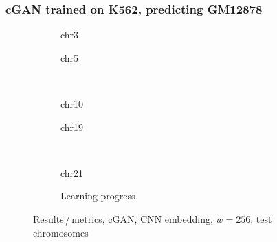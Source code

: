 \subsubsection{cGAN trained on K562, predicting GM12878}\label{sec:appendix:reverseTrainTest}
\begin{figure}[h!] %
    \begin{subfigure}{0.45\textwidth}
        \scriptsize
        \caption{chr3}
    \end{subfigure} \hfill
    \begin{subfigure}{0.45\textwidth}
        \scriptsize
        \caption{chr5}
    \end{subfigure}\\[5mm]
    \begin{subfigure}{0.45\textwidth}
        \scriptsize
        \caption{chr10}
    \end{subfigure}\hfill
    \begin{subfigure}{0.45\textwidth}
        \scriptsize
        \caption{chr19}
    \end{subfigure}\\[3mm]
    \centering
    \begin{subfigure}{0.45\textwidth}
        \scriptsize
        \caption{chr21}
    \end{subfigure} \hfill
    \begin{subfigure}{0.45\textwidth}
        \scriptsize
        \caption{Learning progress} \label{fig:appendix:GAN256_K-on-G_lossEpochs}
    \end{subfigure}
    \caption{Results\,/\,metrics, cGAN, CNN embedding, $w=256$, test chromosomes}   \label{fig:appendix:GAN256_K-on-G_pearson}
\end{figure}
